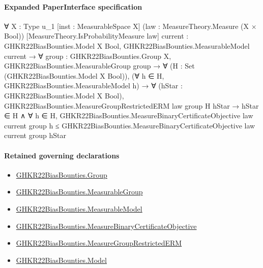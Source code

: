 \documentclass[10pt]{article}
\begin{document}
\paragraph{Expanded PaperInterface specification}
\begin{ReviewVerbatim}
∀ {X : Type u_1} [inst : MeasurableSpace X] (law : MeasureTheory.Measure (X × Bool))
  [MeasureTheory.IsProbabilityMeasure law] {current : GHKR22BiasBounties.Model X Bool},
  GHKR22BiasBounties.MeasurableModel current →
    ∀ {group : GHKR22BiasBounties.Group X},
      GHKR22BiasBounties.MeasurableGroup group →
        ∀ (H : Set (GHKR22BiasBounties.Model X Bool)),
          (∀ h ∈ H, GHKR22BiasBounties.MeasurableModel h) →
            ∀ (hStar : GHKR22BiasBounties.Model X Bool),
              GHKR22BiasBounties.MeasureGroupRestrictedERM law group H hStar →
                hStar ∈ H ∧
                  ∀ h ∈ H,
                    GHKR22BiasBounties.MeasureBinaryCertificateObjective law current group h ≤
                      GHKR22BiasBounties.MeasureBinaryCertificateObjective law current group hStar
\end{ReviewVerbatim}

\paragraph{Retained governing declarations}
\begin{itemize}\raggedright
\item \hyperlink{paper-prerequisite-cc7214115b27106f}{GHKR22\allowbreak{}Bias\allowbreak{}Bounties.\allowbreak{}Group}
\item \hyperlink{governing-declaration-8d5012d60e076f7c}{GHKR22\allowbreak{}Bias\allowbreak{}Bounties.\allowbreak{}Measurable\allowbreak{}Group}
\item \hyperlink{governing-declaration-8b721c00962c326a}{GHKR22\allowbreak{}Bias\allowbreak{}Bounties.\allowbreak{}Measurable\allowbreak{}Model}
\item \hyperlink{governing-declaration-d01ac455a50eb103}{GHKR22\allowbreak{}Bias\allowbreak{}Bounties.\allowbreak{}Measure\allowbreak{}Binary\allowbreak{}Certificate\allowbreak{}Objective}
\item \hyperlink{governing-declaration-ec7787653979c820}{GHKR22\allowbreak{}Bias\allowbreak{}Bounties.\allowbreak{}Measure\allowbreak{}Group\allowbreak{}Restricted\allowbreak{}ERM}
\item \hyperlink{paper-prerequisite-333127605c12eba8}{GHKR22\allowbreak{}Bias\allowbreak{}Bounties.\allowbreak{}Model}
\end{itemize}
\end{document}
